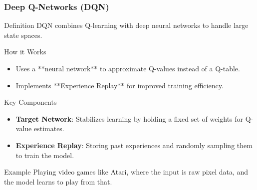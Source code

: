 \documentclass{beamer}
\begin{document}
\begin{frame}[fragile]
    \frametitle{Deep Q-Networks (DQN)}
    \begin{block}{Definition}
        DQN combines Q-learning with deep neural networks to handle large state spaces.
    \end{block}

    \begin{block}{How it Works}
        \begin{itemize}
            \item Uses a **neural network** to approximate Q-values instead of a Q-table.
            \item Implements **Experience Replay** for improved training efficiency.
        \end{itemize}
    \end{block}

    \begin{block}{Key Components}
        \begin{itemize}
            \item \textbf{Target Network}: Stabilizes learning by holding a fixed set of weights for Q-value estimates.
            \item \textbf{Experience Replay}: Storing past experiences and randomly sampling them to train the model.
        \end{itemize}
    \end{block}

    \begin{block}{Example}
        Playing video games like Atari, where the input is raw pixel data, and the model learns to play from that.
    \end{block}
\end{frame}
\end{document}
